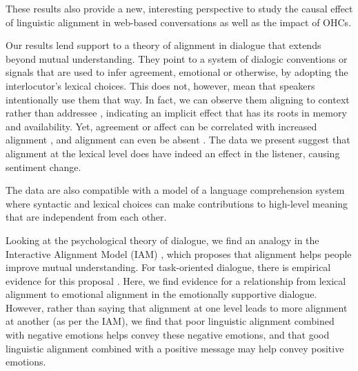 These results also provide a new, interesting perspective to study the causal effect of linguistic alignment in web-based conversations as well as the impact of OHCs.


Our results lend support to a theory of alignment in dialogue that extends beyond mutual understanding.  They point to a system of dialogic conventions or signals that are used to infer agreement, emotional or otherwise, by adopting the interlocutor's lexical choices.  This does not, however, mean that speakers intentionally use them that way.  In fact, we can observe them aligning to context rather than addressee \parencite{reitter2017alignment,wang2014linguistic}, indicating an implicit effect that has its roots in memory and availability.  Yet, agreement or affect can be correlated with increased alignment \parencite{danescu2011chameleons}, and alignment can even be absent \parencite{healey2014divergence}.  The data we present suggest that alignment at the lexical level does have indeed an effect in the listener, causing sentiment change.

The data are also
compatible with a model of a language comprehension system where syntactic and lexical choices can make contributions to high-level meaning that are independent from each other.


Looking at the psychological theory of dialogue, we find an analogy in the Interactive Alignment Model (IAM) \parencite{pickering2004toward}, which proposes that alignment helps people improve mutual understanding.  For task-oriented dialogue, there is empirical evidence for this proposal \parencite{fusaroli2012coming,reitter2014alignment,xu2018information}.  Here, we find evidence for a relationship from lexical alignment to emotional alignment in the emotionally supportive dialogue.  However, rather than saying that alignment at one level leads to more alignment at another (as per the IAM), we find that poor linguistic alignment combined with negative emotions helps convey these negative emotions, and that good linguistic alignment combined with a positive message may help convey positive emotions.


